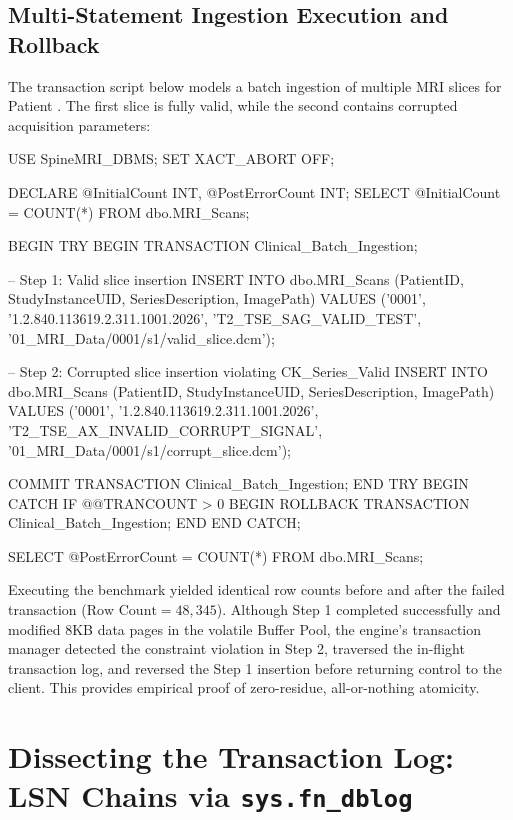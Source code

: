\subsection{Multi-Statement Ingestion Execution and Rollback}
The transaction script below models a batch ingestion of multiple MRI slices for Patient . The first slice is fully valid, while the second contains corrupted acquisition parameters:

\begin{SQLCode}
USE SpineMRI_DBMS;
SET XACT_ABORT OFF;

DECLARE @InitialCount INT, @PostErrorCount INT;
SELECT @InitialCount = COUNT(*) FROM dbo.MRI_Scans;

BEGIN TRY
    BEGIN TRANSACTION Clinical_Batch_Ingestion;

    -- Step 1: Valid slice insertion
    INSERT INTO dbo.MRI_Scans (PatientID, StudyInstanceUID, SeriesDescription, ImagePath)
    VALUES ('0001', '1.2.840.113619.2.311.1001.2026', 'T2_TSE_SAG_VALID_TEST', 
            '01_MRI_Data/0001/s1/valid_slice.dcm');

    -- Step 2: Corrupted slice insertion violating CK_Series_Valid
    INSERT INTO dbo.MRI_Scans (PatientID, StudyInstanceUID, SeriesDescription, ImagePath)
    VALUES ('0001', '1.2.840.113619.2.311.1001.2026', 'T2_TSE_AX_INVALID_CORRUPT_SIGNAL', 
            '01_MRI_Data/0001/s1/corrupt_slice.dcm');

    COMMIT TRANSACTION Clinical_Batch_Ingestion;
END TRY
BEGIN CATCH
    IF @@TRANCOUNT > 0
    BEGIN
        ROLLBACK TRANSACTION Clinical_Batch_Ingestion;
    END
END CATCH;

SELECT @PostErrorCount = COUNT(*) FROM dbo.MRI_Scans;
\end{SQLCode}

Executing the benchmark yielded identical row counts before and after the failed transaction ($\text{Row Count} = 48,345$). Although Step 1 completed successfully and modified 8KB data pages in the volatile Buffer Pool, the engine's transaction manager detected the constraint violation in Step 2, traversed the in-flight transaction log, and reversed the Step 1 insertion before returning control to the client. This provides empirical proof of zero-residue, all-or-nothing atomicity.

\section{Dissecting the Transaction Log: LSN Chains via \texttt{sys.fn\_dblog}}

